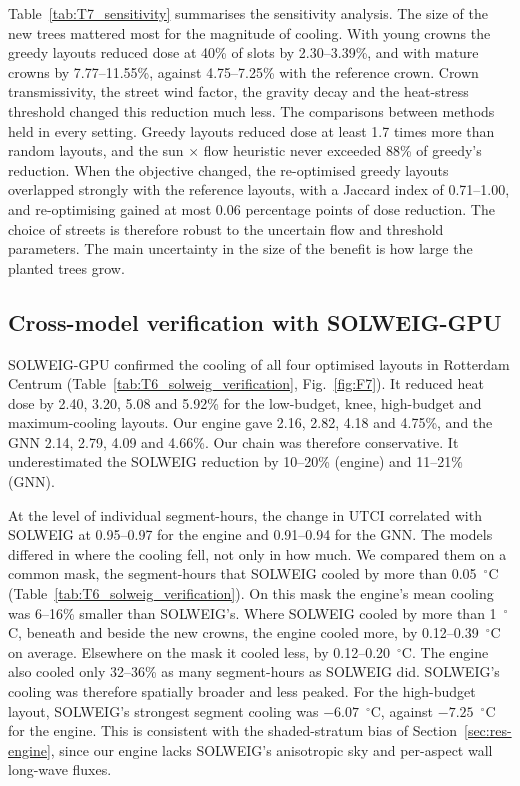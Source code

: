 \documentclass[preprint,12pt,authoryear]{elsarticle}
\newcommand{\degC}{\ensuremath{^\circ}C}
\begin{document}
Table~\ref{tab:T7_sensitivity} summarises the sensitivity analysis. The size of the new trees mattered most for the magnitude of cooling. With young crowns the greedy layouts reduced dose at 40\% of slots by 2.30--3.39\%, and with mature crowns by 7.77--11.55\%, against 4.75--7.25\% with the reference crown. Crown transmissivity, the street wind factor, the gravity decay and the heat-stress threshold changed this reduction much less. The comparisons between methods held in every setting. Greedy layouts reduced dose at least 1.7 times more than random layouts, and the sun $\times$ flow heuristic never exceeded 88\% of greedy's reduction. When the objective changed, the re-optimised greedy layouts overlapped strongly with the reference layouts, with a Jaccard index of 0.71--1.00, and re-optimising gained at most 0.06 percentage points of dose reduction. The choice of streets is therefore robust to the uncertain flow and threshold parameters. The main uncertainty in the size of the benefit is how large the planted trees grow.



\subsection{Cross-model verification with SOLWEIG-GPU}\label{sec:res-verify}

SOLWEIG-GPU confirmed the cooling of all four optimised layouts in Rotterdam Centrum (Table~\ref{tab:T6_solweig_verification}, Fig.~\ref{fig:F7}). It reduced heat dose by 2.40, 3.20, 5.08 and 5.92\% for the low-budget, knee, high-budget and maximum-cooling layouts. Our engine gave 2.16, 2.82, 4.18 and 4.75\%, and the GNN 2.14, 2.79, 4.09 and 4.66\%. Our chain was therefore conservative. It underestimated the SOLWEIG reduction by 10--20\% (engine) and 11--21\% (GNN).

At the level of individual segment-hours, the change in UTCI correlated with SOLWEIG at 0.95--0.97 for the engine and 0.91--0.94 for the GNN. The models differed in where the cooling fell, not only in how much. We compared them on a common mask, the segment-hours that SOLWEIG cooled by more than 0.05~\degC{} (Table~\ref{tab:T6_solweig_verification}). On this mask the engine's mean cooling was 6--16\% smaller than SOLWEIG's. Where SOLWEIG cooled by more than 1~\degC, beneath and beside the new crowns, the engine cooled more, by 0.12--0.39~\degC{} on average. Elsewhere on the mask it cooled less, by 0.12--0.20~\degC. The engine also cooled only 32--36\% as many segment-hours as SOLWEIG did. SOLWEIG's cooling was therefore spatially broader and less peaked. For the high-budget layout, SOLWEIG's strongest segment cooling was $-6.07$~\degC, against $-7.25$~\degC{} for the engine. This is consistent with the shaded-stratum bias of Section~\ref{sec:res-engine}, since our engine lacks SOLWEIG's anisotropic sky and per-aspect wall long-wave fluxes.
\end{document}
